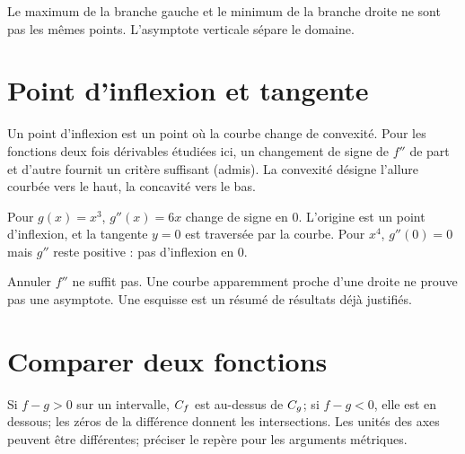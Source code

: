 \begin{visualisation}
\begin{center}\end{center}
Le maximum de la branche gauche et le minimum de la branche droite ne sont pas les mêmes points. L’asymptote verticale sépare le domaine.
\end{visualisation}
\section{Point d’inflexion et tangente}
\begin{definition}Un point d’inflexion est un point où la courbe change de convexité. Pour les fonctions deux fois dérivables étudiées ici, un changement de signe de $f''$ de part et d’autre fournit un critère suffisant (admis). La convexité désigne l’allure courbée vers le haut, la concavité vers le bas.\end{definition}
\begin{exemple}Pour $g(x)=x^3$, $g''(x)=6x$ change de signe en $0$. L’origine est un point d’inflexion, et la tangente $y=0$ est traversée par la courbe. Pour $x^4$, $g''(0)=0$ mais $g''$ reste positive : pas d’inflexion en $0$.\end{exemple}
\begin{avertissement}Annuler $f''$ ne suffit pas. Une courbe apparemment proche d’une droite ne prouve pas une asymptote. Une esquisse est un résumé de résultats déjà justifiés.\end{avertissement}
\section{Comparer deux fonctions}
Si $f-g>0$ sur un intervalle, $C_f$ est au-dessus de $C_g$; si $f-g<0$, elle est en dessous; les zéros de la différence donnent les intersections. Les unités des axes peuvent être différentes; préciser le repère pour les arguments métriques.

